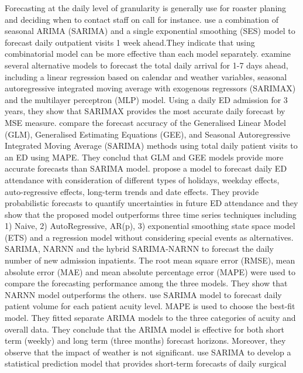 \documentclass[
  authoryear,
  preprint,
  3p]{elsarticle}
\begin{document}
Forecasting at the daily level of granularity is generally use for
roaster planing and deciding when to contact staff on call for instance.
\citet{luo2017hospital} use a combination of seasonal ARIMA (SARIMA) and
a single exponential smoothing (SES) model to forecast daily outpatient
visits 1 week ahead.They indicate that using combinatorial model can be
more effective than each model separately. \citet{whitt2019forecasting}
examine several alternative models to forecast the total daily arrival
for 1-7 days ahead, including a linear regression based on calendar and
weather variables, seasonal autoregressive integrated moving average
with exogenous regressors (SARIMAX) and the multilayer perceptron (MLP)
model. Using a daily ED admission for 3 years, they show that SARIMAX
provides the most accurate daily forecast by MSE measure.
\citet{marcilio2013forecasting} compare the forecast accuracy of the
Generalised Linear Model (GLM), Generalised Estimating Equations (GEE),
and Seasonal Autoregressive Integrated Moving Average (SARIMA) methods
using total daily patient visits to an ED using MAPE. They conclud that
GLM and GEE models provide more accurate forecasts than SARIMA model.
\citet{rostami2020anticipating} propose a model to forecast daily ED
attendance with consideration of different types of holidays, weekday
effects, auto-regressive effects, long-term trends and date effects.
They provide probabilistic forecasts to quantify uncertainties in future
ED attendance and they show that the proposed model outperforms three
time series techniques including 1) Naive, 2) AutoRegressive, AR(p), 3)
exponential smoothing state space model (ETS) and a regression model
without considering special events as alternatives. \citet{zhou2018time}
SARIMA, NARNN and the hybrid SARIMA-NARNN to forecast the daily number
of new admission inpatients. The root mean square error (RMSE), mean
absolute error (MAE) and mean absolute percentage error (MAPE) were used
to compare the forecasting performance among the three models. They show
that NARNN model outperforms the others. \citet{sun2009forecasting} use
SARIMA model to forecast daily patient volume for each patient acuity
level. MAPE is used to choose the best-fit model. They fitted separate
ARIMA models to the three categories of acuity and overall data. They
conclude that the ARIMA model is effective for both short term (weekly)
and long term (three months) forecast horizons. Moreover, they observe
that the impact of weather is not significant.
\citet{zinouri2018modelling} use SARIMA to develop a statistical
prediction model that provides short-term forecasts of daily surgical
\end{document}
